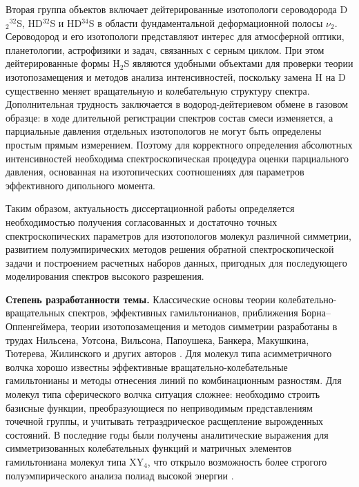 Вторая группа объектов включает дейтерированные изотопологи сероводорода D$_2{}^{32}$S, HD$^{32}$S и
HD$^{34}$S в области фундаментальной деформационной полосы $\nu_2$. Сероводород и его изотопологи
представляют интерес для атмосферной оптики, планетологии, астрофизики и задач, связанных с серным
циклом. При этом дейтерированные формы H$_2$S являются удобными объектами для проверки теории
изотопозамещения и методов анализа интенсивностей, поскольку замена H на D существенно меняет
вращательную и колебательную структуру спектра. Дополнительная трудность заключается в
водород-дейтериевом обмене в газовом образце: в ходе длительной регистрации спектров состав смеси
изменяется, а парциальные давления отдельных изотопологов не могут быть определены простым прямым
измерением. Поэтому для корректного определения абсолютных интенсивностей необходима спектроскопическая
процедура оценки парциального давления, основанная на изотопических соотношениях для параметров
эффективного дипольного момента.

Таким образом, актуальность диссертационной работы определяется необходимостью получения согласованных
и достаточно точных спектроскопических параметров для изотопологов молекул различной симметрии,
развитием полуэмпирических методов решения обратной спектроскопической задачи и построением расчетных
наборов данных, пригодных для последующего моделирования спектров высокого разрешения.

\textbf{Степень разработанности темы.}
Классические основы теории колебательно-вращательных спектров, эффективных гамильтонианов,
приближения Борна--Оппенгеймера, теории изотопозамещения и методов симметрии разработаны в трудах
Нильсена, Уотсона, Вильсона, Папоушека, Банкера, Макушкина, Тютерева, Жилинского и других авторов
\cite{nielsen,Watson1968,Watson1977,WilsonDeciusCross1955,Papousek1982,BunkerJensen1998,Makushkin1984,Zhilinskii1984}.
Для молекул типа асимметричного волчка хорошо известны эффективные вращательно-колебательные
гамильтонианы и методы отнесения линий по комбинационным разностям. Для молекул типа сферического
волчка ситуация сложнее: необходимо строить базисные функции, преобразующиеся по неприводимым
представлениям точечной группы, и учитывать тетраэдрическое расщепление вырожденных состояний. В
последние годы были получены аналитические выражения для симметризованных колебательных функций и
матричных элементов гамильтониана молекул типа XY$_4$, что открыло возможность более строгого
полуэмпирического анализа полиад высокой энергии \cite{ulen1,ulen2}.


